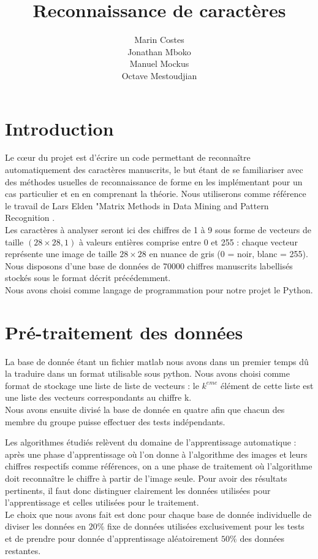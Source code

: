 \documentclass[a4paper,11pt,twoside]{report}
\author{Marin Costes\\Jonathan Mboko\\Manuel Mockus\\Octave Mestoudjian}
\title{Reconnaissance de caractères}
\begin{document}
 
\maketitle 

\tableofcontents
\chapter{Introduction}
Le cœur du projet est d'écrire un code permettant de reconnaître automatiquement des caractères manuscrits, le but étant de se familiariser avec des méthodes usuelles de reconnaissance de forme en les implémentant pour un cas particulier et en en comprenant la théorie. 
Nous utiliserons comme référence le travail de Lars Elden "Matrix Methods in Data Mining and Pattern Recognition  \cite{Elden}. \\

Les caractères à analyser seront ici des chiffres de 1 à 9 sous forme de vecteurs de taille $(28\times28,1)$ à valeurs entières comprise entre 0 et 255 : chaque vecteur représente une image de taille $28\times28$ en nuance de gris (0 = noir, blanc = 255). Nous disposons d'une base de données de 70000 chiffres manuscrits labellisés stockés sous le format décrit précédemment.\\


Nous avons choisi comme langage de programmation pour notre projet le Python.

\chapter{Pré-traitement des données}
La base de donnée étant un fichier matlab nous avons dans un premier temps dû la traduire dans un format utilisable sous python. Nous avons choisi comme format de stockage une liste de liste de vecteurs : le $k^{eme}$ élément de cette liste est une liste des vecteurs correspondants au chiffre k.\\
Nous avons ensuite divisé la base de donnée en quatre afin que chacun des membre du groupe puisse effectuer des tests indépendants. 

Les algorithmes étudiés relèvent du domaine de l'apprentissage automatique : après une phase d'apprentissage où l'on donne à l'algorithme des images et leurs chiffres respectifs comme références, on a une phase de traitement où l'algorithme doit reconnaître le chiffre à partir de l'image seule. Pour avoir des résultats pertinents, il faut donc distinguer clairement les données utilisées pour l'apprentissage et celles utilisées pour le traitement.\\Le choix que nous avons fait est donc pour chaque base de donnée individuelle de diviser les données en $20\%$ fixe de données utilisées exclusivement pour les tests et de prendre pour donnée d'apprentissage aléatoirement $50\%$ des données restantes.
\end{document}
